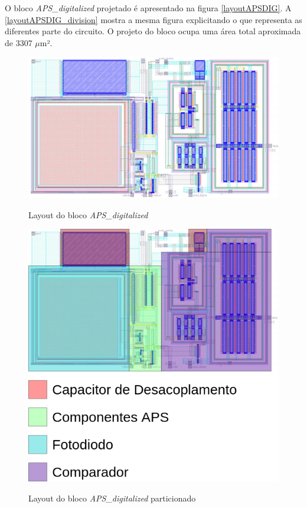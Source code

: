 O bloco \textit{APS\_digitalized} projetado é apresentado na figura \autoref{layoutAPSDIG}. A \autoref{layoutAPSDIG_division} mostra a mesma figura explicitando o que representa as diferentes parte do circuito. O projeto do bloco ocupa uma área total aproximada de 3307 $\mu$m².

\begin{figure}[!h]
 \centering
    \centering
    \caption{Layout do bloco \textit{APS\_digitalized}} 
    \includegraphics[scale=0.8]{Resultados/Imagens/APS_DIGITALIZED.png}
    \label{layoutAPSDIG}
\end{figure}

\begin{figure}[!h]
 \centering
    \centering
    \caption{Layout do bloco \textit{APS\_digitalized} particionado} 
    \includegraphics[scale=0.3]{Resultados/Imagens/Image_APS_Digitalized.png}
    \label{layoutAPSDIG_division}
\end{figure}

